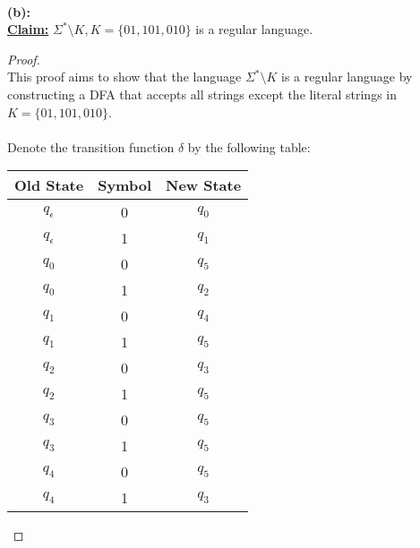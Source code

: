 \documentclass[12pt]{article}
\begin{document}
\leavevmode\\
\textbf{(b):} \\
\textbf{\underline{Claim:}} $\Sigma^* \setminus K, K = \{ 01, 101, 010 \}$ is a regular language.
\begin{proof}
\leavevmode\\
    This proof aims to show that the language $\Sigma^* \setminus K$ is a regular language by constructing a DFA that accepts all strings except the literal strings in $K = \{ 01, 101, 010 \}$. \\
    \\
    Denote the transition function $\delta$ by the following table:
    \begin{table}[!h]
        \centering
        \begin{tabular}{|c|c|c|}
            \hline
            \textbf{Old State} & \textbf{Symbol} & \textbf{New State} \\
            \hline
            \( q_\epsilon \) & 0 & \( q_0 \) \\
            \( q_\epsilon \) & 1 & \( q_1 \) \\
            \hline
            \( q_0 \) & 0 & \( q_5 \) \\
            \( q_0 \) & 1 & \( q_2 \) \\
            \hline
            \( q_1 \) & 0 & \( q_4 \) \\
            \( q_1 \) & 1 & \( q_5 \) \\
            \hline
            \( q_2 \) & 0 & \( q_3 \) \\
            \( q_2 \) & 1 & \( q_5 \) \\
            \hline
            \( q_3 \) & 0 & \( q_5 \) \\
            \( q_3 \) & 1 & \( q_5 \) \\
            \hline
            \( q_4 \) & 0 & \( q_5 \) \\
            \( q_4 \) & 1 & \( q_3\) \\
            \hline

\end{tabular}
\end{table}
\end{proof}
\end{document}
